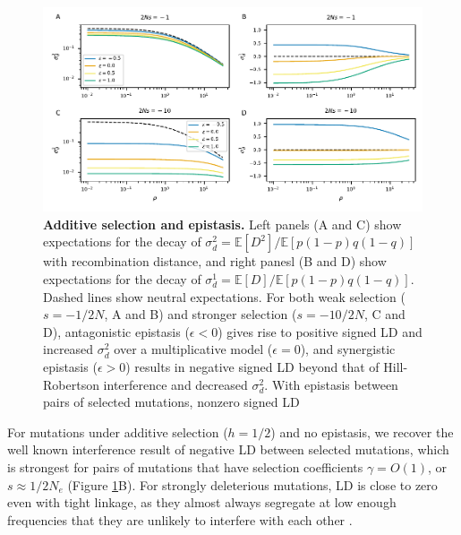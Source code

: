 \documentclass[]{article}
\newcommand{\E}{\mathbb{E}}
\begin{document}
\begin{figure}[tb!]
    \centering
    \includegraphics{../figures/epistasis_prediction}
    \caption{
        \textbf{Additive selection and epistasis.}
        Left panels (A and C) show expectations for the decay of
        \(\sigma_d^2 = \E[D^2] / \E[p(1-p)q(1-q)]\) with recombination
        distance, and right panesl (B and D) show expectations for the
        decay of \(\sigma_d^1 = \E[D] / \E[p(1-p)q(1-q)]\). Dashed lines
        show neutral expectations.
        For both weak selection (\(s=-1/2N\), A and B) and stronger selection
        (\(s=-10/2N\), C and D), antagonistic epistasis (\(\epsilon < 0\))
        gives rise to positive signed LD and increased $\sigma_d^2$ over
        a multiplicative model (\(\epsilon = 0\)),
        and synergistic epistasis (\(\epsilon > 0\)) results in negative signed
        LD beyond that of Hill-Robertson interference and decreased \(\sigma_d^2\).
        With epistasis between pairs of selected mutations, nonzero signed LD
    }
    \label{fig:epistasis}
\end{figure}

For mutations under additive selection (\(h=1/2\)) and no epistasis, we
recover the well known \citet{Hill1966-gv} interference result of negative LD
between selected mutations, which is strongest for pairs of mutations that have
selection coefficients \(\gamma = O(1)\), or \(s \approx 1/2N_e\) (Figure
\ref{fig:epistasis}B).
For strongly deleterious mutations, LD is close to zero even
with tight linkage, as they almost always segregate at low enough frequencies
that they are unlikely to interfere with each other \citep{McVean2000-ox}.
\end{document}
